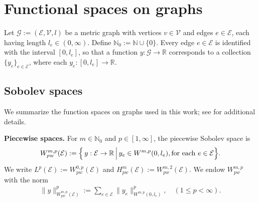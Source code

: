 \documentclass[10pt,a4paper]{amsart}
\def\to{\rightarrow}
\begin{document}
\appendix

\section{Functional spaces on graphs}\label{appendix1}

Let $\mathcal{G} := (\mathcal{E}, \mathcal{V}, l)$ be a metric graph with vertices $v \in \mathcal{V}$ and edges $e \in \mathcal{E}$, each having length $l_e \in (0,\infty)$. Define $\mathbb{N}_0 := \mathbb{N} \cup \{0\}$. Every edge $e \in \mathcal{E}$ is identified with the interval $[0,l_e]$, so that a function $y:\mathcal{G}\to\mathbb{R}$ corresponds to a collection $\{y_e\}_{e\in\mathcal{E}}$, where each $y_e:[0,l_e]\to\mathbb{R}$.

\subsection{Sobolev spaces}

We summarize the function spaces on graphs used in this work; see \cite[Chapter 3]{Mugnolo} for additional details.
\smallbreak

\noindent
\textbf{Piecewise spaces.} For $m \in \mathbb{N}_0$ and $p \in [1,\infty]$, the piecewise Sobolev space is
\[
W_{pw}^{m,p}(\mathcal{E})
:=
\Bigl\{\,y:\mathcal{E}\to\mathbb{R} \,\Big|\,
y_e \in W^{m,p}(0,l_e),\text{for each }e\in\mathcal{E}\Bigr\}.
\]
We write $L^p(\mathcal{E}):=W_{pw}^{0,p}(\mathcal{E})$ and $H_{pw}^m(\mathcal{E}) := W_{pw}^{m,2}(\mathcal{E})$. We endow $W_{pw}^{m,p}$ with the norm
\begin{align}
\|y\|_{W_{pw}^{m,p}(\mathcal{E})}^p
:=
\sum_{e\in\mathcal{E}}
\bigl\|y_e\bigr\|_{W^{m,p}(0,l_e)}^p,
\quad (1 \le p < \infty).
\end{align}
\end{document}
